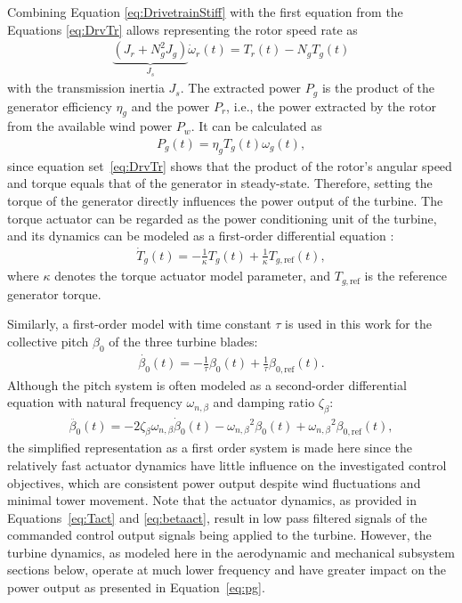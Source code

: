 Combining Equation \eqref{eq:DrivetrainStiff} with the first equation from the Equations \eqref{eq:DrvTr} allows representing the rotor speed rate as
\begin{align*}
    \underbrace{(J_r + N^2_g J_g)}_{J_s}\dot{\omega}_r(t)= T_r(t) - N_g T_g(t)
\end{align*}
with the transmission inertia $J_s$. The extracted power $P_{g}$ is the product of the generator efficiency $\eta_{g}$ and the power $P_r$, i.e., the power extracted by the rotor from the available wind power $P_w$. It can be calculated as 
\begin{align}\label{eq:pg}
    P_{g}(t) = \eta_{g} T_{g}(t) \omega_{g}(t),
\end{align}
since equation set~\eqref{eq:DrvTr} shows that the product of the rotor's angular speed and torque equals that of the generator in steady-state. Therefore, setting the torque of the generator directly influences the power output of the turbine.
%
The torque actuator can be regarded as the power conditioning unit of the turbine, and its dynamics can be modeled as a first-order differential equation \cite{odgaard2013fault}:
\begin{align}\label{eq:Tact}
    \dot{T}_{g}(t) = -\frac{1}{\kappa} T_{g}(t) + \frac{1}{\kappa} T_{g,\text{ref}}(t), 
\end{align}
where $\kappa$ denotes the torque actuator model parameter, and $T_{g,\text{ref}}$ is the reference generator torque.

Similarly, a first-order model with time constant $\tau$ is used in this work for the collective pitch $\beta_0$ of the three turbine blades:
\begin{align}\label{eq:betaact}
    \dot{\beta_0}(t) = -\frac{1}{\tau}\beta_0(t) + \frac{1}{\tau}\beta_{0,\text{ref}}(t).
\end{align}
Although the pitch system is often modeled as a second-order differential equation with natural frequency $\omega_{n,\beta}$ and damping ratio $\zeta_{\beta}$:
\begin{align*}
    \ddot{\beta_0}(t) = -2\zeta_{\beta} \omega_{n,\beta} \dot{\beta}_0(t) - {\omega_{n,\beta}}^2 \beta_0(t) + {\omega_{n,\beta}}^2 \beta_{0,\text{ref}}(t),
\end{align*}
the simplified representation as a first order system is made here since the relatively fast actuator dynamics have little influence on the investigated control objectives, which are consistent power output despite wind fluctuations and minimal tower movement. Note that the actuator dynamics, as provided in Equations~\eqref{eq:Tact} and \eqref{eq:betaact}, result in low pass filtered signals of the commanded control output signals being applied to the turbine. However, the turbine dynamics, as modeled here in the aerodynamic and mechanical subsystem sections below, operate at much lower frequency and have greater impact on the power output as presented in Equation~\eqref{eq:pg}.
